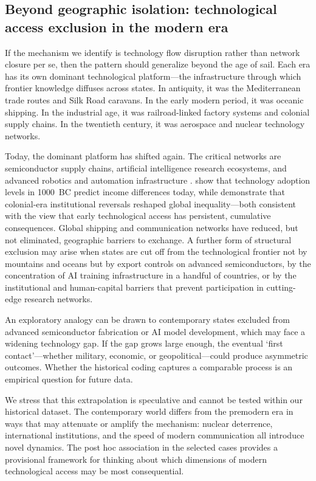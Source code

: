 \documentclass[pdflatex,sn-basic]{sn-jnl}
\theoremstyle{thmstyleone}%
\theoremstyle{thmstyletwo}%
\theoremstyle{thmstylethree}%
\begin{document}
\subsection{Beyond geographic isolation: technological access exclusion in the modern era}\label{sec:disc-modern}

If the mechanism we identify is technology flow disruption rather than network closure per se, then the pattern should generalize beyond the age of sail. Each era has its own dominant technological platform---the infrastructure through which frontier knowledge diffuses across states. In antiquity, it was the Mediterranean trade routes and Silk Road caravans. In the early modern period, it was oceanic shipping. In the industrial age, it was railroad-linked factory systems and colonial supply chains. In the twentieth century, it was aerospace and nuclear technology networks.

Today, the dominant platform has shifted again. The critical networks are semiconductor supply chains, artificial intelligence research ecosystems, and advanced robotics and automation infrastructure \citep{AcemogluRestrepo2020, CominMestieri2018}. \citet{CominEasterlyGong2010} show that technology adoption levels in 1000~BC predict income differences today, while \citet{AcemogluJohnsonRobinson2002} demonstrate that colonial-era institutional reversals reshaped global inequality---both consistent with the view that early technological access has persistent, cumulative consequences. Global shipping and communication networks have reduced, but not eliminated, geographic barriers to exchange. A further form of structural exclusion may arise when states are cut off from the technological frontier not by mountains and oceans but by export controls on advanced semiconductors, by the concentration of AI training infrastructure in a handful of countries, or by the institutional and human-capital barriers that prevent participation in cutting-edge research networks.

An exploratory analogy can be drawn to contemporary states excluded from advanced semiconductor fabrication or AI model development, which may face a widening technology gap. If the gap grows large enough, the eventual `first contact'---whether military, economic, or geopolitical---could produce asymmetric outcomes. Whether the historical coding captures a comparable process is an empirical question for future data.

We stress that this extrapolation is speculative and cannot be tested within our historical dataset. The contemporary world differs from the premodern era in ways that may attenuate or amplify the mechanism: nuclear deterrence, international institutions, and the speed of modern communication all introduce novel dynamics. The post hoc association in the selected cases provides a provisional framework for thinking about which dimensions of modern technological access may be most consequential.
\end{document}
